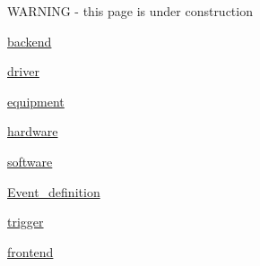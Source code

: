 \par
  \par


 WARNING -\/ this page is under construction 


\begin{DoxyItemize}
\item \hyperlink{Intro_idx_backend}{backend} 
\item \hyperlink{Intro_idx_device-driver}{driver} 
\item \hyperlink{FrontendOperation_Equipment_definition}{equipment} 
\begin{DoxyItemize}
\item \hyperlink{FrontendOperation_FE_hw_equipment}{hardware} 
\item \hyperlink{FrontendOperation_FE_sw_equipment}{software} 
\end{DoxyItemize}
\item \hyperlink{FrontendOperation_Event_definition}{Event\_\-definition} 
\begin{DoxyItemize}
\item \hyperlink{FrontendOperation_FE_event_trigger}{trigger} 
\end{DoxyItemize}
\item \hyperlink{Intro_idx_frontend}{frontend}


\end{DoxyItemize}

\label{index_end}
\hypertarget{index_end}{}
 \par
  \par
 